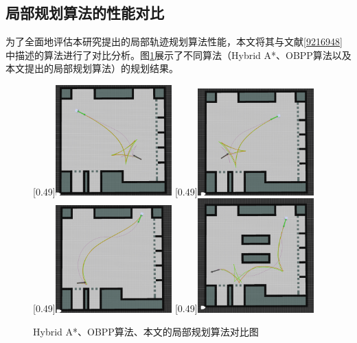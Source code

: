 \documentclass[master,academic]{ysuthesis} %
\begin{document}
		\subsection{局部规划算法的性能对比}
		为了全面地评估本研究提出的局部轨迹规划算法性能，本文将其与文献\ref{9216948}中描述的算法进行了对比分析。图\ref{fig:Hybrid A*、OBPP算法、本文的局部规划算法对比图}展示了不同算法（Hybrid A*、OBPP算法以及本文提出的局部规划算法）的规划结果。
		\begin{figure}[H]
			\centering
			[0.49\textwidth]{\includegraphics[width=0.4\textwidth]{fig/局部对比1.png}}
			[0.49\textwidth]{\includegraphics[width=0.4\textwidth]{fig/局部对比2.png}}
			[0.49\textwidth]{\includegraphics[width=0.4\textwidth]{fig/局部对比3.png}}
			[0.49\textwidth]{\includegraphics[width=0.4\textwidth]{fig/局部对比4.png}}
			\caption{Hybrid A*、OBPP算法、本文的局部规划算法对比图}
			\label{fig:Hybrid A*、OBPP算法、本文的局部规划算法对比图}
		\end{figure}
		
\end{document}
